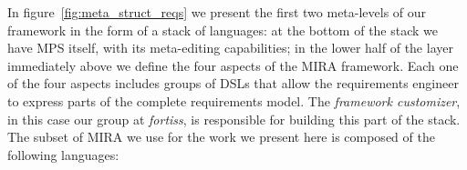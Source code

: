 In figure~\ref{fig:meta_struct_reqs} we present the first two meta-levels of our
framework in the form of a stack of languages: at the bottom of the stack we
have MPS itself, with its meta-editing capabilities; in the lower half of the
layer immediately above we define the four aspects of the MIRA framework. Each one of the four
aspects includes groups of DSLs that allow the requirements engineer to express
parts of the complete requirements model. The \emph{framework customizer}, in
this case our group at \emph{fortiss}, is responsible for building this part of
the stack. The subset of MIRA we use for the work we present here is composed of
the following languages:
\vspace{-.1cm}
